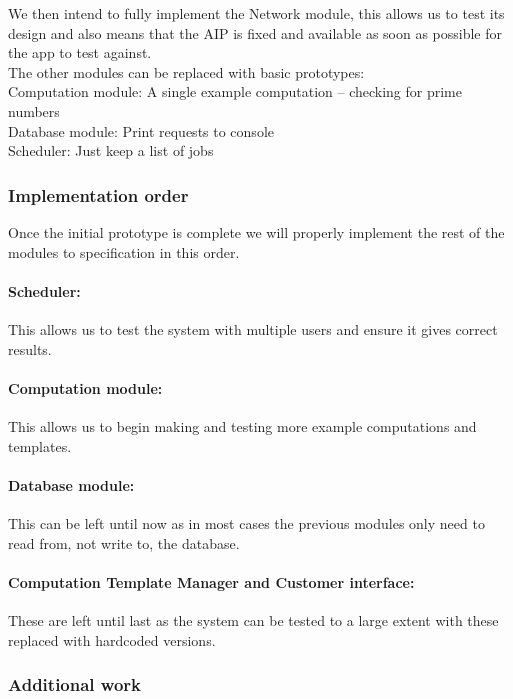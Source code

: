 \documentclass[
  twoside,
  10pt, a4paper
]{article}
\begin{document}
We then intend to fully implement the Network module, this allows us to test its design and also means that the AIP is fixed and available as soon as possible for the app to test against.\\

The other modules can be replaced with basic prototypes:\\
Computation module: A single example computation -- checking for prime numbers\\
Database module: Print requests to console\\
Scheduler: Just keep a list of jobs\\


\subsubsection{Implementation order}

Once the initial prototype is complete we will properly implement the rest of the modules to specification in this order.

\paragraph{Scheduler:} This allows us to test the system with multiple users and ensure it gives correct results.

\paragraph{Computation module:} This allows us to begin making and testing more example computations and templates.

\paragraph{Database module:} This can be left until now as in most cases the previous modules only need to read from, not write to, the database.

\paragraph{Computation Template Manager and Customer interface:} These are left until last as the system can be tested to a large extent with these replaced with hardcoded versions.


\subsubsection{Additional work}
\end{document}
